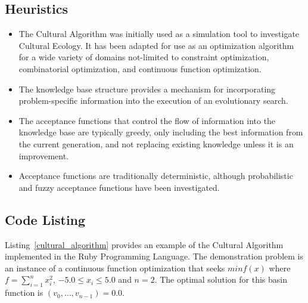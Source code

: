 \subsection{Heuristics}
\begin{itemize}
	\item The Cultural Algorithm was initially used as a simulation tool to investigate Cultural Ecology. It has been adapted for use as an optimization algorithm for a wide variety of domains not-limited to constraint optimization, combinatorial optimization, and continuous function optimization.
	\item The knowledge base structure provides a mechanism for incorporating problem-specific information into the execution of an evolutionary search.
	\item The acceptance functions that control the flow of information into the knowledge base are typically greedy, only including the best information from the current generation, and not replacing existing knowledge unless it is an improvement.
	\item Acceptance functions are traditionally deterministic, although probabilistic and fuzzy acceptance functions have been investigated.
\end{itemize}

\subsection{Code Listing}
Listing~\ref{cultural_algorithm} provides an example of the Cultural Algorithm implemented in the Ruby Programming Language. 
The demonstration problem is an instance of a continuous function optimization that seeks $min f(x)$ where $f=\sum_{i=1}^n x_{i}^2$, $-5.0\leq x_i \leq 5.0$ and $n=2$. The optimal solution for this basin function is $(v_0,\ldots,v_{n-1})=0.0$.

